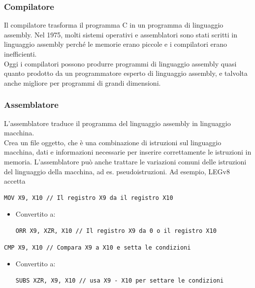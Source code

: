 \documentclass[12pt,a4paper]{article}
\begin{document}
\subsubsection{Compilatore}
Il compilatore trasforma il programma C in un programma di linguaggio assembly. Nel 1975, molti sistemi operativi e assemblatori sono stati scritti in linguaggio assembly perché le memorie erano piccole e i compilatori erano inefficienti.\\
Oggi i compilatori possono produrre programmi di linguaggio assembly quasi quanto prodotto da un programmatore esperto di linguaggio assembly, e talvolta anche migliore per programmi di grandi dimensioni.

\subsubsection{Assemblatore}
L'assemblatore traduce il programma del linguaggio assembly in linguaggio macchina.\\
Crea un file oggetto, che è una combinazione di istruzioni sul linguaggio macchina, dati e informazioni necessarie per inserire correttamente le istruzioni in memoria.
L'assemblatore può anche trattare le variazioni comuni delle istruzioni del linguaggio della macchina, ad es. pseudoistruzioni. Ad esempio, LEGv8 accetta
\begin{verbatim}
MOV X9, X10 // Il registro X9 da il registro X10
\end{verbatim}
\begin{itemize}
\item Convertito a: \begin{minipage}{.2\linewidth}
\begin{verbatim}
ORR X9, XZR, X10 // Il registro X9 da 0 o il registro X10
\end{verbatim}
\end{minipage}
\end{itemize}
\begin{verbatim}
CMP X9, X10 // Compara X9 a X10 e setta le condizioni
\end{verbatim}
\begin{itemize}
\item Convertito a: \begin{minipage}{.2\linewidth}
\begin{verbatim}
SUBS XZR, X9, X10 // usa X9 - X10 per settare le condizioni
\end{verbatim}
\end{minipage}
\end{itemize}
\end{document}
